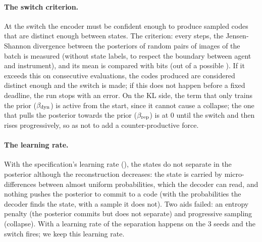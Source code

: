 \documentclass[10pt]{article}
\begin{document}
\paragraph{The switch criterion.}
At the switch the encoder must be confident enough to produce sampled codes that are distinct enough between states.
The criterion: every \eThreeSwitchEvalEvery{} steps, the Jensen-Shannon divergence between the posteriors of
\eThreeSwitchPairs{} random pairs of images of the batch is measured (without state labels, to respect the boundary
between agent and instrument), and its mean is compared with \eThreeSwitchJS{} bits (out of a possible
\eThreeLatentVars).
If it exceeds this on \eThreeSwitchConsecutive{} consecutive evaluations, the codes produced are considered distinct
enough and the switch is made; if this does not happen before a fixed deadline, the run stops with an error.
On the KL side, the term that only trains the prior ($\beta_{\mathrm{dyn}}$) is active from the start, since it cannot cause a
collapse; the one that pulls the posterior towards the prior ($\beta_{\mathrm{rep}}$) is at 0 until the switch and then rises %
progressively, so as not to add a counter-productive force.

\paragraph{The learning rate.}
With the specification's learning rate (\eThreeLrAfterSwitch), the states do not separate in the posterior although the
reconstruction decreases: the state is carried by micro-differences between almost uniform probabilities, which the
decoder can read, and nothing pushes the posterior to commit to a code (with the probabilities the decoder finds the
state, with a sample it does not).
Two aids failed: an entropy penalty (the posterior commits but does not separate) and progressive sampling (collapse).
With a learning rate of \eThreeLr{} the separation happens on the 3 seeds and the switch fires; we keep this learning %
rate.
\end{document}
